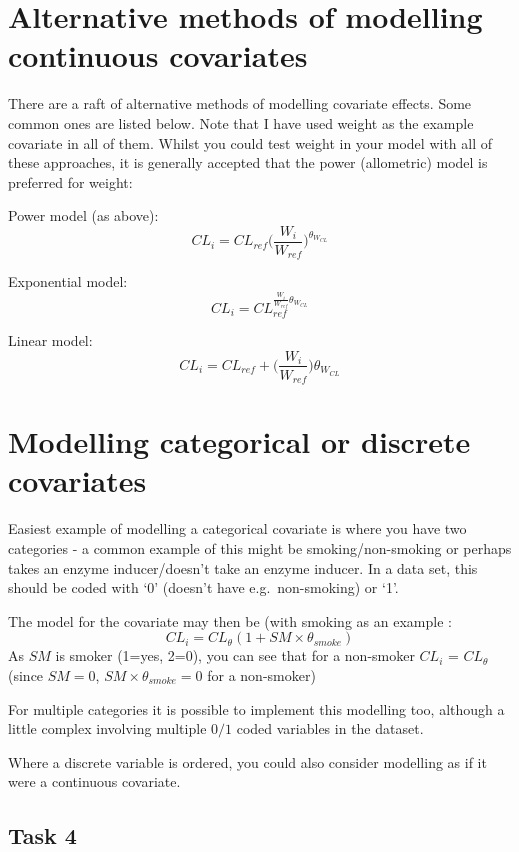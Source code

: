 \documentclass[
]{article}
\begin{document}
\newpage

\section{Alternative methods of modelling continuous covariates}\label{alternative-methods-of-modelling-continuous-covariates}

There are a raft of alternative methods of modelling covariate effects. Some common ones are listed below. Note that I have used weight as the example covariate in all of them. Whilst you could test weight in your model with all of these approaches, it is generally accepted that the power (allometric) model is preferred for weight:

Power model (as above):\[CL_i=CL_{ref}\bigg( \frac{W_i}{W_{ref}} \bigg) ^ {\theta_{W_{CL}}} \]

Exponential model:\[CL_i=CL_{ref} ^{\frac{W_i}{W_{ref}} {\theta_{W_{CL}}}} \]

Linear model: \[CL_i=CL_{ref}+\bigg( \frac{W_i}{W_{ref}} \bigg) {\theta_{W_{CL}}} \]

\section{Modelling categorical or discrete covariates}\label{modelling-categorical-or-discrete-covariates}

Easiest example of modelling a categorical covariate is where you have two categories - a common example of this might be smoking/non-smoking or perhaps takes an enzyme inducer/doesn't take an enzyme inducer. In a data set, this should be coded with `0' (doesn't have e.g.~non-smoking) or `1'.

The model for the covariate may then be (with smoking as an example :\[CL_i=CL_{\theta}(1+ SM\times{\theta_{smoke}}) \] As \(SM\) is smoker (1=yes, 2=0), you can see that for a non-smoker \(CL_i\) = \(CL_{\theta}\) (since \(SM=0\), \(SM\times{\theta_{smoke}} = 0\) for a non-smoker)

For multiple categories it is possible to implement this modelling too, although a little complex involving multiple \(0/1\) coded variables in the dataset.

Where a discrete variable is ordered, you could also consider modelling as if it were a continuous covariate.

\subsection{Task 4}\label{task-4}
\end{document}
